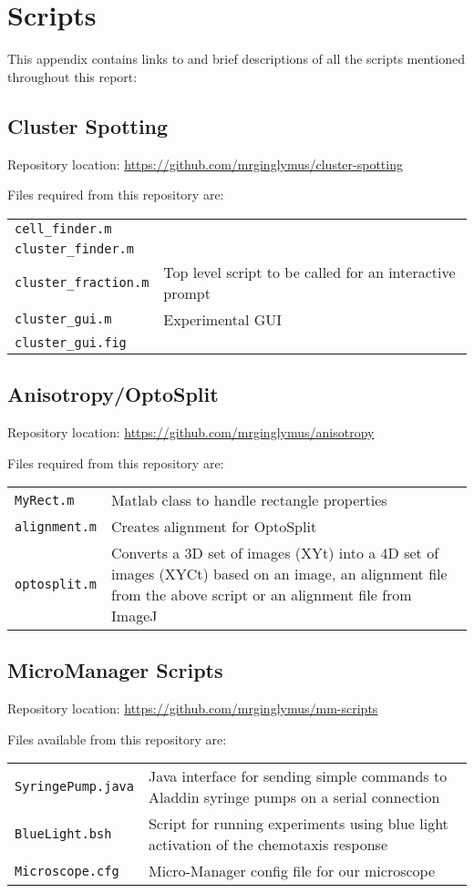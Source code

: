 \documentclass[../main.tex]{subfiles}
\begin{document}
\section{Scripts}

This appendix contains links to and brief descriptions of all the scripts mentioned throughout this report:

\subsection{Cluster Spotting}
\label{sec:scripts:clusters}
Repository location: \url{https://github.com/mrginglymus/cluster-spotting}

Files required from this repository are:


\begin{tabular}{ll}
\texttt{cell\_finder.m}	&	\\
\texttt{cluster\_finder.m}	&	\\
\texttt{cluster\_fraction.m}	&	Top level script to be called for an interactive prompt	\\
\texttt{cluster\_gui.m}		&	Experimental GUI \\
\texttt{cluster\_gui.fig}	&	
\end{tabular}

\subsection{Anisotropy/OptoSplit}
\label{sec:scripts:anisotropy}
Repository location: \url{https://github.com/mrginglymus/anisotropy}

Files required from this repository are:


\begin{tabular}{lp{12cm}}
\texttt{MyRect.m}	&	Matlab class to handle rectangle properties \\
\texttt{alignment.m}	&	Creates alignment for OptoSplit \\
\texttt{optosplit.m}	&	Converts a 3D set of images (XYt) into a 4D set of images (XYCt) based on an image, an alignment file from the above script or an alignment file from ImageJ
\end{tabular}

\subsection{MicroManager Scripts}
\label{sec:scripts:micromanager}

Repository location: \url{https://github.com/mrginglymus/mm-scripts}

Files available from this repository are:

\begin{tabular}{lp{12cm}}
\texttt{SyringePump.java}	&	Java interface for sending simple commands to Aladdin syringe pumps on a serial connection \\
\texttt{BlueLight.bsh}	&	Script for running experiments using blue light activation of the chemotaxis response \\
\texttt{Microscope.cfg}	&	Micro-Manager config file for our microscope
\end{tabular}
\end{document}
